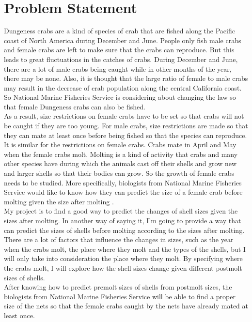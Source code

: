 \documentclass[12pt,letterpaper]{article}
\theoremstyle{definition}
\begin{document}
\section{Problem Statement}
Dungeness crabs are a kind of species of crab that are fished along the Pacific coast of North America during December and June. People only fish male crabs and female crabs are left to make sure that the crabs can reproduce. But this leads to great fluctuations in the catches of crabs. During December and June, there are a lot of male crabs being caught while in other months of the year, there may be none. Also, it is thought that the large ratio of female to male crabs may result in the decrease of crab population along the central California coast. So National Marine Fisheries Service is considering about changing the law so that female Dungeness crabs can also be fished.\\
As a result, size restrictions on female crabs have to be set so that crabs will not be caught if they are too young. For male crabs, size restrictions are made so that they can mate at least once before being fished so that the species can reproduce. It is similar for the restrictions on female crabs. Crabs mate in April and May when the female crabs molt. Molting is a kind of activity that crabs and many other species have during which the animals cast off their shells and grow new and larger shells so that their bodies can grow. So the growth of female crabs needs to be studied. More specifically, biologists from National Marine Fisheries Service would like to know how they can predict the size of a female crab before molting given the size after molting \cite{deb}.\\
My project is to find a good way to predict the changes of shell sizes given the sizes after molting. In another way of saying it, I'm going to provide a way that can predict the sizes of shells before molting according to the sizes after molting. There are a lot of factors that influence the changes in sizes, such as the year when the crabs molt, the place where they molt and the types of the shells, but I will only take into consideration the place where they molt. By specifying where the crabs molt, I will explore how the shell sizes change given different postmolt sizes of shells.\\
After knowing how to predict premolt sizes of shells from postmolt sizes, the biologists from National Marine Fisheries Service will be able to find a proper size of the nets so that the female crabs caught by the nets have already mated at least once.
\end{document}
